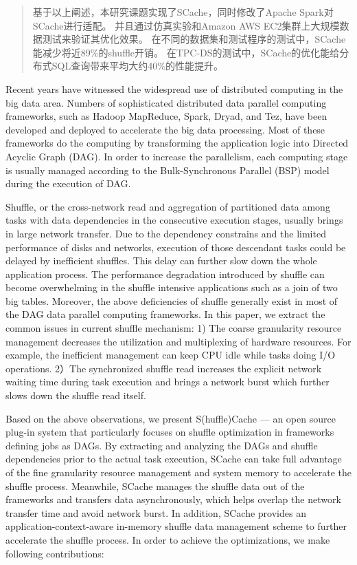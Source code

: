 \begin{abstract}
基于以上阐述，本研究课题实现了SCache，同时修改了Apache Spark对SCache进行适配。
并且通过仿真实验和Amazon AWS EC2集群上大规模数据测试来验证其优化效果。
在不同的数据集和测试程序的测试中，SCache能减少将近89\%的shuffle开销。
在TPC-DS的测试中，SCache的优化能给分布式SQL查询带来平均大约40\%的性能提升。

\end{abstract}

\begin{englishabstract}

Recent years have witnessed the widespread use of distributed computing in the big data area.
Numbers of sophisticated distributed data parallel computing frameworks, such as Hadoop MapReduce\cite{hadoop}, Spark\cite{apachespark}, Dryad\cite{dryad}, and Tez\cite{tez},
have been developed and deployed to accelerate the big data processing.
Most of these frameworks do the computing by transforming the application logic into Directed Acyclic Graph (DAG).
In order to increase the parallelism, each computing stage is usually managed according to the Bulk-Synchronous Parallel (BSP) model during the execution of DAG.

Shuffle, or the cross-network read and aggregation of partitioned data among tasks with data dependencies in the consecutive execution stages, 
usually brings in large network transfer. 
Due to the dependency constrains and the limited performance of disks and networks, execution of those descendant tasks could be delayed by inefficient shuffles. 
This delay can further slow down the whole application process. 
The performance degradation introduced by shuffle can become overwhelming in the shuffle intensive applications such as a join of two big tables.
Moreover, the above deficiencies of shuffle generally exist in most of the DAG data parallel computing frameworks. 
In this paper, we extract the common issues in current shuffle mechanism: 
1) The coarse granularity resource management decreases the utilization and multiplexing of hardware resources. For example, the inefficient management can keep CPU idle while tasks doing I/O operations.
2）The synchronized shuffle read increases the explicit network waiting time during task execution and brings a network burst which further slows down the shuffle read itself.

Based on the above observations, we present S(huffle)Cache --- an open source plug-in system that particularly focuses on shuffle optimization in frameworks defining jobs as DAGs. 
By extracting and analyzing the DAGs and shuffle dependencies prior to the actual task execution, 
SCache can take full advantage of the fine granularity resource management and system memory to accelerate the shuffle process. 
Meanwhile, SCache manages the shuffle data out of the frameworks and transfers data asynchronously, which helps overlap the network transfer time and avoid network burst.
In addition, SCache provides an application-context-aware in-memory shuffle data management scheme to further accelerate the shuffle process.  
In order to achieve the optimizations, we make following contributions:


\end{englishabstract}

